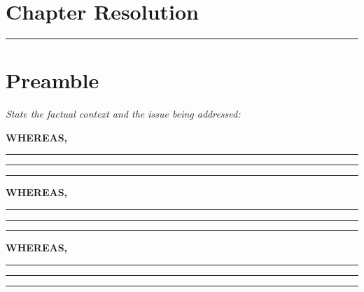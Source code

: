 \documentclass[11pt, letterpaper]{article}
\begin{document}

\section*{Chapter Resolution}

\vspace{0.5em}
{\color{afp-teal}\rule{\textwidth}{0.5pt}}
\vspace{1em}


\vspace{1em}

\section{Preamble}

\noindent\textit{State the factual context and the issue being addressed:}

\vspace{0.5em}

\noindent\textbf{WHEREAS,} \rule{\textwidth}{0.4pt}

\vspace{0.3em}\noindent\rule{\textwidth}{0.4pt}

\vspace{0.3em}\noindent\rule{\textwidth}{0.4pt}

\vspace{1em}

\noindent\textbf{WHEREAS,} \rule{\textwidth}{0.4pt}

\vspace{0.3em}\noindent\rule{\textwidth}{0.4pt}

\vspace{0.3em}\noindent\rule{\textwidth}{0.4pt}

\vspace{1em}

\noindent\textbf{WHEREAS,} \rule{\textwidth}{0.4pt}

\vspace{0.3em}\noindent\rule{\textwidth}{0.4pt}

\vspace{0.3em}\noindent\rule{\textwidth}{0.4pt}

\vspace{1em}
\end{document}
